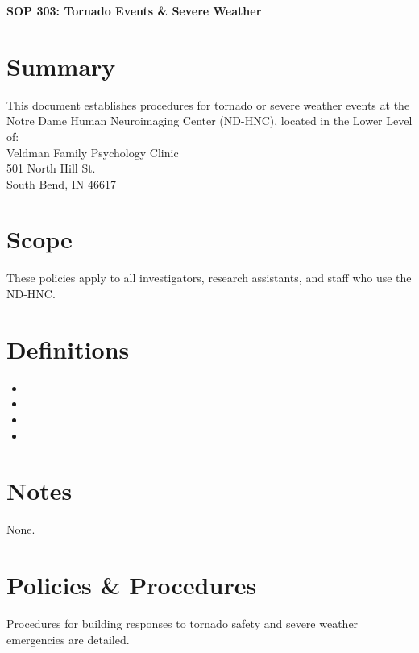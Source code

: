 \documentclass[11pt]{article}
\begin{document}
\renewcommand{\labelenumii}{\arabic{enumi}.\arabic{enumii}}
\renewcommand{\labelenumiii}{\arabic{enumi}.\arabic{enumii}.\arabic{enumiii}}
\renewcommand{\labelenumiv}{\arabic{enumi}.\arabic{enumii}.\arabic{enumiii}.\arabic{enumiv}}

\begin{center}
	\textbf{\Large SOP 303: Tornado Events \& Severe Weather}\\
	\hrulefill
\end{center}


\section{Summary}
This document establishes  procedures for tornado or severe weather events at the Notre Dame Human Neuroimaging Center (ND-HNC), located in the Lower Level of:\\

Veldman Family Psychology Clinic\\
501 North Hill St.\\
South Bend, IN 46617

\section{Scope}
These policies apply to all investigators, research assistants, and staff who use the ND-HNC.

\section{Definitions}

\begin{itemize}
	\item \NDHNC
	\item \TornadoWarn
	\item \TornadoWatch
	\item \VFPC
\end{itemize}


\section{Notes}

None.


\section{Policies \& Procedures}

Procedures for building responses to tornado safety and severe weather emergencies are detailed.
\end{document}
